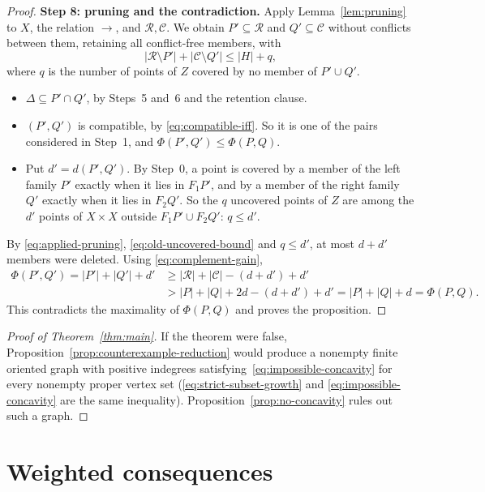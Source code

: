 \documentclass[11pt]{article}
\theoremstyle{remark}
\newcommand{\abs}[1]{\lvert #1\rvert}
\newcommand{\Step}[1]{\par\medskip\noindent\textbf{#1}\enspace}
\newcommand{\cR}{\mathcal R}
\newcommand{\cC}{\mathcal C}
\begin{document}
\begin{proof}
\Step{Step 8: pruning and the contradiction.}
Apply Lemma~\ref{lem:pruning} to $X$, the relation $\to$, and
$\cR,\cC$. We obtain $P'\subseteq\mathcal R$ and $Q'\subseteq\mathcal C$
without conflicts between them, retaining all conflict-free members, with
\begin{equation}\label{eq:applied-pruning}
 \abs{\cR\setminus P'}+\abs{\cC\setminus Q'}\le\abs H+q,
\end{equation}
where $q$ is the number of points of $Z$ covered by no member of
$P'\cup Q'$.
\begin{itemize}[leftmargin=2em]
\item $\Delta\subseteq P'\cap Q'$, by Steps~5 and~6 and the retention
clause.
\item $(P',Q')$ is compatible, by \eqref{eq:compatible-iff}. So it is one
of the pairs considered in Step~1, and $\Phi(P',Q')\le\Phi(P,Q)$.
\item Put $d'=d(P',Q')$. By Step~0, a point is covered by a member of the
left family $P'$ exactly when it lies in $F_1P'$, and by a member of the
right family $Q'$ exactly when it lies in $F_2Q'$. So the $q$ uncovered
points of $Z$ are among the $d'$ points of $X\times X$ outside
$F_1P'\cup F_2Q'$: $q\le d'$.
\end{itemize}
By \eqref{eq:applied-pruning}, \eqref{eq:old-uncovered-bound} and
$q\le d'$, at most $d+d'$ members were deleted. Using
\eqref{eq:complement-gain},
\[
 \begin{aligned}
 \Phi(P',Q')=\abs{P'}+\abs{Q'}+d'
 &\ge \abs{\mathcal R}+\abs{\mathcal C}-(d+d')+d'\\
 &>\abs P+\abs Q+2d-(d+d')+d'=\abs P+\abs Q+d=\Phi(P,Q).
 \end{aligned}
\]
This contradicts the maximality of $\Phi(P,Q)$ and proves the proposition.
\end{proof}

\begin{proof}[Proof of Theorem~\ref{thm:main}]
If the theorem were false, Proposition~\ref{prop:counterexample-reduction}
would produce a nonempty finite oriented graph with positive indegrees
satisfying~\eqref{eq:impossible-concavity} for every nonempty proper vertex
set (\eqref{eq:strict-subset-growth} and \eqref{eq:impossible-concavity}
are the same inequality). Proposition~\ref{prop:no-concavity} rules out
such a graph.
\end{proof}

\section{Weighted consequences}\label{sec:weighted-consequences}
\end{document}
